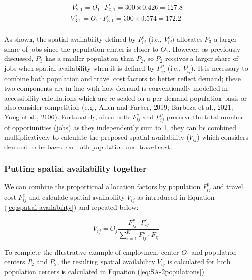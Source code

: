 \documentclass[]{elsarticle} %
\begin{document}
\begin{equation}
\label{eq:tcost-allocation-factor-SA-2populations}
\begin{array}{l}\
V^c_{2,1} = O_1 \cdot F^c_{2,1} = 300 \times 0.426 = 127.8\\
V^c_{3,1} = O_1 \cdot F^c_{3,1} = 300 \times  0.574 = 172.2\\
\end{array}
\end{equation}

As shown, the spatial availability defined by \(F^c_{ij}\) (i.e.,
\(V^c_{ij}\)) allocates \(P_3\) a larger share of jobs since the
population center is closer to \(O_1\). However, as previously
discussed, \(P_3\) has a smaller population than \(P_2\), so \(P_2\)
receives a larger share of jobs when spatial availability when it is
defined by \(F^p_{ij}\) (i.e., \(V^p_{ij}\)). It is necessary to combine
both population and travel cost factors to better reflect demand; these
two components are in line with how demand is conventionally modelled in
accessibility calculations which are re-scaled on a per
demand-population basis or also consider competition (e.g., Allen and
Farber, 2019; Barboza et al., 2021; Yang et al., 2006). Fortunately,
since both \(F^c_{ij}\) and \(F^p_{ij}\) preserve the total number of
opportunities (jobs) as they independently sum to 1, they can be
combined multiplicatively to calculate the proposed spatial availability
(\(V_{ij}\)) which considers demand to be based on both population and
travel cost.

\hypertarget{putting-spatial-availability-together}{%
\subsubsection{Putting spatial availability
together}\label{putting-spatial-availability-together}}

We can combine the proportional allocation factors by population
\(F^p_{ij}\) and travel cost \(F^c_{ij}\) and calculate spatial
availability \(V_{ij}\) as introduced in Equation
(\ref{eq:spatial-availability}) and repeated below:

\[
V_{ij} = O_j\frac{F^p_{ij} \cdot F^c_{ij}}{\sum_{i=1}^K F^p_{ij} \cdot F^c_{ij}}
\]

To complete the illustrative example of employment center \(O_1\) and
population centers \(P_2\) and \(P_3\), the resulting spatial
availability \(V_{ij}\) is calculated for both population centers is
calculated in Equation (\ref{eq:SA-2populations}).
\end{document}
